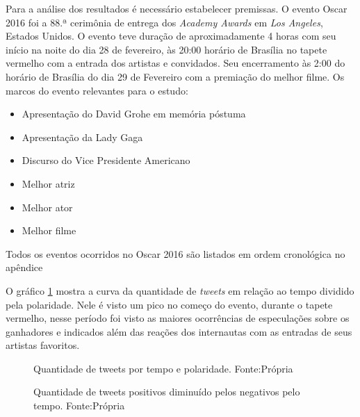 Para a análise dos resultados é necessário estabelecer premissas. O evento Oscar 2016 foi a  88.ª cerimônia de entrega dos \textit{Academy Awards} em \textit{Los Angeles}, Estados Unidos. O evento teve duração de aproximadamente 4 horas com seu início na noite do dia 28 de fevereiro, às 20:00 horário de Brasília no tapete vermelho com a entrada dos artistas e convidados. Seu encerramento às 2:00 do horário de Brasília do dia 29 de Fevereiro com a premiação do melhor filme. Os marcos do evento relevantes para o estudo: 
\begin{itemize}
	\item Apresentação do David Grohe em memória póstuma
	\item Apresentação da Lady Gaga 
	\item Discurso do Vice Presidente Americano
	\item Melhor atriz
	\item Melhor ator
	\item Melhor filme
\end{itemize}
Todos os eventos ocorridos no Oscar 2016 são listados em ordem cronológica no apêndice 

O gráfico \ref{qtd} mostra a curva da quantidade de \textit{tweets} em relação ao tempo  dividido pela polaridade. Nele é visto um pico  no começo do evento, durante o tapete vermelho, nesse período foi visto as maiores ocorrências de especulações sobre os ganhadores e indicados além das reações dos internautas com as entradas de seus artistas favoritos.

\begin{figure}[H]
	\centering{}
	\caption{Quantidade de tweets por tempo e polaridade. Fonte:Própria}
	\label{qtd}
\end{figure}

\begin{figure}[H]
	\centering{}
	\caption{Quantidade de tweets positivos diminuído pelos negativos pelo tempo. Fonte:Própria}
	\label{qtdnegpos}
\end{figure}

